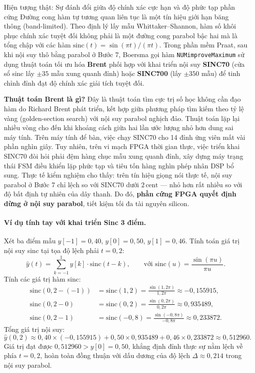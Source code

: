 \begin{firstprin}{Hiện tượng thật: Sự đánh đổi giữa độ chính xác cực hạn và độ phức tạp phần cứng}
Đường cong hàm tự tương quan liên tục là một tín hiệu giới hạn băng thông (band-limited). Theo định lý lấy mẫu Whittaker--Shannon, hàm số khôi phục chính xác tuyệt đối không phải là một đường cong parabol bậc hai mà là tổng chập với các hàm $\mathrm{sinc}(t) = \sin(\pi t)/(\pi t)$. Trong phần mềm Praat, sau khi nội suy thô bằng parabol ở Bước 7, Boersma gọi hàm \texttt{NUMimproveMaximum} sử dụng thuật toán tối ưu hóa \textbf{Brent} phối hợp với khai triển nội suy \textbf{SINC70} (cửa sổ sinc lấy $\pm 35$ mẫu xung quanh đỉnh) hoặc \textbf{SINC700} (lấy $\pm 350$ mẫu) để tinh chỉnh đỉnh đạt độ chính xác giải tích tuyệt đối.

\textbf{Thuật toán Brent là gì?} Đây là thuật toán tìm cực trị số học không cần đạo hàm do Richard Brent phát triển, kết hợp giữa phương pháp tìm kiếm theo tỷ lệ vàng (golden-section search) với nội suy parabol nghịch đảo. Thuật toán lặp lại nhiều vòng cho đến khi khoảng cách giữa hai lần ước lượng nhỏ hơn dung sai máy tính. Trên máy tính để bàn, việc chạy SINC70 cho 14 đỉnh ứng viên mất vài phần nghìn giây. Tuy nhiên, trên vi mạch FPGA thời gian thực, việc triển khai SINC70 đòi hỏi phải đệm hàng chục mẫu xung quanh đỉnh, xây dựng máy trạng thái FSM điều khiển lặp phức tạp và tiêu tốn hàng nghìn phép nhân DSP bổ sung. Thực tế kiểm nghiệm cho thấy: trên tín hiệu giọng nói thực tế, nội suy parabol ở Bước 7 chỉ lệch so với SINC70 dưới $2\,\text{cent}$ --- nhỏ hơn rất nhiều so với độ bất định tự nhiên của dây thanh. Do đó, \textbf{phần cứng FPGA quyết định dừng ở nội suy parabol}, tiết kiệm tối đa tài nguyên silicon.
\end{firstprin}

\paragraph{Ví dụ tính tay với khai triển Sinc 3 điểm.}
Xét ba điểm mẫu $y[-1] = 0{,}40$, $y[0] = 0{,}50$, $y[1] = 0{,}46$.
Tính toán giá trị nội suy sinc tại tọa độ lệch phải $t = 0{,}2$:
\[
\hat{y}(t) = \sum_{k=-1}^{1} y[k] \cdot \mathrm{sinc}(t - k), \qquad \text{với } \mathrm{sinc}(u) = \frac{\sin(\pi u)}{\pi u}.
\]
Tính các giá trị hàm sinc:
\begin{align*}
\mathrm{sinc}(0{,}2 - (-1)) &= \mathrm{sinc}(1{,}2) = \frac{\sin(1{,}2\pi)}{1{,}2\pi} \approx -0{,}155915,\\[4pt]
\mathrm{sinc}(0{,}2 - 0)    &= \mathrm{sinc}(0{,}2) = \frac{\sin(0{,}2\pi)}{0{,}2\pi} \approx 0{,}935489,\\[4pt]
\mathrm{sinc}(0{,}2 - 1)    &= \mathrm{sinc}(-0{,}8) = \frac{\sin(-0{,}8\pi)}{-0{,}8\pi} \approx 0{,}233872.
\end{align*}
Tổng giá trị nội suy:
\[
\hat{y}(0{,}2) \approx 0{,}40 \times (-0{,}155915) + 0{,}50 \times 0{,}935489 + 0{,}46 \times 0{,}233872 \approx 0{,}512960.
\]
Giá trị đạt được $0{,}512960 > y[0] = 0{,}50$, khẳng định đỉnh thực sự nằm lệch về phía $t = 0{,}2$, hoàn toàn đồng thuận với dấu dương của độ lệch $\Delta \approx 0{,}214$ trong nội suy parabol.


